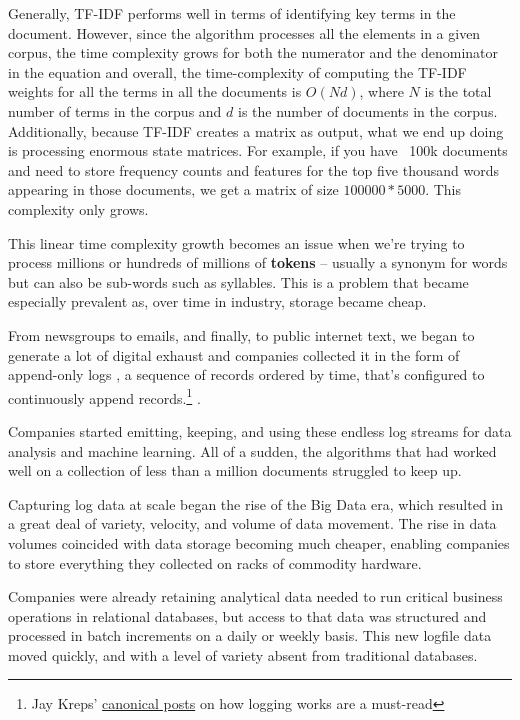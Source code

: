 \documentclass[11pt, table]{diazessay} %
\begin{document}
\begin{sloppypar}
Generally, TF-IDF performs well in terms of identifying key terms in the document. However, since the algorithm processes all the elements in a given corpus, the time complexity grows for both the numerator and the denominator in the equation and overall, the time-complexity of computing the TF-IDF weights for all the terms in all the documents is $O(Nd)$, where $N$ is the total number of terms in the corpus and $d$ is the number of documents in the corpus. Additionally, because TF-IDF creates a matrix as output, what we end up doing is processing enormous state matrices. For example, if you have ~100k documents and need to store frequency counts and features for the top five thousand words appearing in those documents, we get a matrix of size $100000*5000$. This complexity only grows.

This linear time complexity growth becomes an issue when we're trying to process millions or hundreds of millions of \textbf{tokens} -- usually a synonym for words but can also be sub-words such as syllables. This is a problem that became especially prevalent as, over time in industry, storage became cheap.

From newsgroups to emails, and finally, to public internet text, we began to generate a lot of digital exhaust and companies collected it in the form of append-only logs \citep{kreps2014heart}, a sequence of records ordered by time, that's configured to continuously append records.\footnote{Jay Kreps' \href{https://engineering.linkedin.com/distributed-systems/log-what-every-software-engineer-should-know-about-real-time-datas-unifying}{canonical posts} on how logging works are a must-read} .

Companies started emitting, keeping, and using these endless log streams for data analysis and machine learning. All of a sudden, the algorithms that had worked well on a collection of less than a million documents struggled to keep up.

Capturing log data at scale began the rise of the Big Data era, which resulted in a great deal of variety, velocity, and volume of data movement. The rise in data volumes coincided with data storage becoming much cheaper, enabling companies to store everything they collected on racks of commodity hardware.

Companies were already retaining analytical data needed to run critical business operations in relational databases, but access to that data was structured and processed in batch increments on a daily or weekly basis. This new logfile data moved quickly, and with a level of variety absent from traditional databases.


\end{sloppypar}
\end{document}
